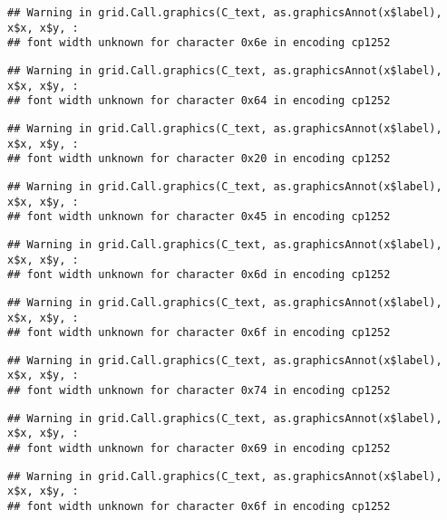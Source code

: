 \documentclass[
]{article}
\begin{document}
\begin{verbatim}
## Warning in grid.Call.graphics(C_text, as.graphicsAnnot(x$label), x$x, x$y, :
## font width unknown for character 0x6e in encoding cp1252
\end{verbatim}

\begin{verbatim}
## Warning in grid.Call.graphics(C_text, as.graphicsAnnot(x$label), x$x, x$y, :
## font width unknown for character 0x64 in encoding cp1252
\end{verbatim}

\begin{verbatim}
## Warning in grid.Call.graphics(C_text, as.graphicsAnnot(x$label), x$x, x$y, :
## font width unknown for character 0x20 in encoding cp1252
\end{verbatim}

\begin{verbatim}
## Warning in grid.Call.graphics(C_text, as.graphicsAnnot(x$label), x$x, x$y, :
## font width unknown for character 0x45 in encoding cp1252
\end{verbatim}

\begin{verbatim}
## Warning in grid.Call.graphics(C_text, as.graphicsAnnot(x$label), x$x, x$y, :
## font width unknown for character 0x6d in encoding cp1252
\end{verbatim}

\begin{verbatim}
## Warning in grid.Call.graphics(C_text, as.graphicsAnnot(x$label), x$x, x$y, :
## font width unknown for character 0x6f in encoding cp1252
\end{verbatim}

\begin{verbatim}
## Warning in grid.Call.graphics(C_text, as.graphicsAnnot(x$label), x$x, x$y, :
## font width unknown for character 0x74 in encoding cp1252
\end{verbatim}

\begin{verbatim}
## Warning in grid.Call.graphics(C_text, as.graphicsAnnot(x$label), x$x, x$y, :
## font width unknown for character 0x69 in encoding cp1252
\end{verbatim}

\begin{verbatim}
## Warning in grid.Call.graphics(C_text, as.graphicsAnnot(x$label), x$x, x$y, :
## font width unknown for character 0x6f in encoding cp1252
\end{verbatim}
\end{document}
